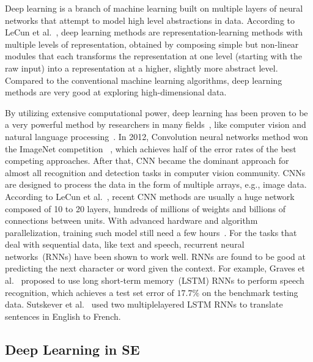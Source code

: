 \documentclass[sigconf,review, anonymous]{acmart}
\theoremstyle{break}
\begin{document}
Deep learning is a branch of machine learning built on multiple layers of neural networks that attempt to model high level abstractions in data. According to LeCun et al.~\cite{lecun2015deep}, deep learning methods are representation-learning methods with multiple levels of representation,
obtained by composing simple but non-linear modules that each
transforms the representation at one level (starting with the raw input)
into a representation at a higher, slightly more abstract level. Compared to the conventional
machine learning algorithms, deep learning methods are very good at exploring high-dimensional data.

By utilizing extensive computational power, 
deep learning has been proven to be a very powerful method 
by researchers in many fields~\cite{lecun2015deep}, like computer vision and natural language processing~\cite{krizhevsky2012imagenet,mikolov2013distributed,sutskever2014sequence,schmidhuber2015deep,arel2010deep}. In 2012, 
Convolution neural networks method won the ImageNet competition ~\cite{krizhevsky2012imagenet},
which achieves half of the error rates of the best competing
approaches. After that, CNN became the dominant approach for almost all recognition
and detection tasks in computer vision community. CNNs are designed to process the data in the form of multiple arrays, e.g., image data. According to LeCun et al.~\cite{lecun2015deep},
recent CNN methods are usually a huge network composed of 10 to 20 layers, hundreds of millions of weights and billions of connections between units. With advanced hardware and algorithm parallelization, training such model still need a few hours~\cite{lecun2015deep}. 
For the tasks that deal with sequential data, like text and speech, recurrent neural networks~(RNNs) have been shown to work well. 
RNNs are found to be good at predicting the next character or word given the context. For example, Graves et al.~\cite{graves2013speech} proposed to use long short-term memory~(LSTM) RNNs to perform speech recognition, 
which achieves a test set error of $17.7\%$ on the benchmark testing data. Sutskever et al.~\cite{sutskever2014sequence} used two multiplelayered LSTM RNNs to translate sentences in English to French.




\subsection{Deep Learning in SE}
\end{document}
